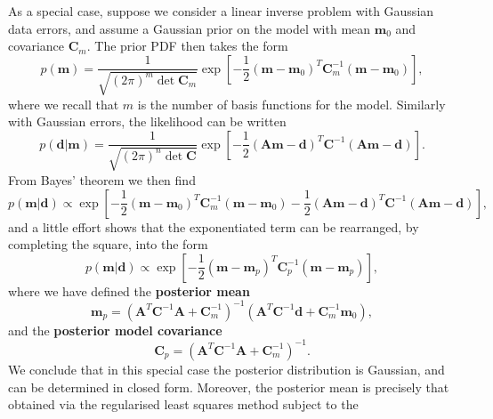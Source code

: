 As a special case, suppose we consider a linear inverse problem with Gaussian data errors, and assume a Gaussian 
prior on the model with mean $\mathbf{m}_{0}$ and covariance $\mathbf{C}_{m}$. The prior PDF then takes the form
\begin{equation}
    p(\mathbf{m}) = \frac{1}{\sqrt{(2\pi)^{m}\det \mathbf{C}_{m}}} \exp\left[-\frac{1}{2}(\mathbf{m}-\mathbf{m}_{0})^{T}
    \mathbf{C}_{m}^{-1}(\mathbf{m}-\mathbf{m}_{0})\right],
    \label{eq:38}
\end{equation}
where we recall that $m$ is the number of basis functions for the model. Similarly with Gaussian errors, the likelihood can be written
\begin{equation}
    p(\mathbf{d}|\mathbf{m}) = \frac{1}{\sqrt{(2\pi)^{n}\det \mathbf{C}}} \exp\left[-\frac{1}{2}(\mathbf{A}\mathbf{m}
    -\mathbf{d})^{T}\mathbf{C}^{-1}(\mathbf{A}\mathbf{m}-\mathbf{d})\right].
    \label{eq:39}
\end{equation}
From Bayes' theorem we then find
\begin{equation}
    p(\mathbf{m}|\mathbf{d}) \propto \exp\left[-\frac{1}{2}(\mathbf{m}-\mathbf{m}_{0})^{T}\mathbf{C}_{m}^{-1}(\mathbf{m}
    -\mathbf{m}_{0}) - \frac{1}{2}(\mathbf{A}\mathbf{m}-\mathbf{d})^{T}\mathbf{C}^{-1}(\mathbf{A}\mathbf{m}-\mathbf{d})\right],
    \label{eq:40}
\end{equation}
and a little effort shows that the exponentiated term can be rearranged, by completing the square, into the form
\begin{equation}
    p(\mathbf{m}|\mathbf{d}) \propto \exp\left[-\frac{1}{2}(\mathbf{m}-\mathbf{m}_{p})^{T}\mathbf{C}_{p}^{-1}
    (\mathbf{m}-\mathbf{m}_{p})\right],
    \label{eq:41}
\end{equation}
where we have defined the \textbf{posterior mean}
\begin{equation}
    \mathbf{m}_{p} = (\mathbf{A}^{T}\mathbf{C}^{-1}\mathbf{A} + \mathbf{C}_{m}^{-1})^{-1} (\mathbf{A}^{T}
    \mathbf{C}^{-1}\mathbf{d} + \mathbf{C}_{m}^{-1}\mathbf{m}_{0}),
    \label{eq:42}
\end{equation}
and the \textbf{posterior model covariance}
\begin{equation}
    \mathbf{C}_{p} = (\mathbf{A}^{T}\mathbf{C}^{-1}\mathbf{A} + \mathbf{C}_{m}^{-1})^{-1}.
    \label{eq:43}
\end{equation}
We conclude that in this special case the posterior distribution is Gaussian, and can be determined in closed form. 
Moreover, the posterior mean is precisely that obtained via the regularised least squares method subject to the 
